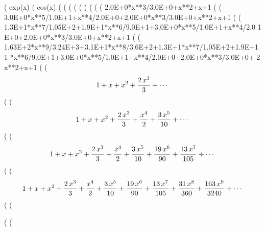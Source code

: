 (%
                                        exp(x)
(%
                                        cos(x)
(%
(%
(%
(%
(%
(%
(%
(%
(%
      2.0E+0*x**3/3.0E+0+x**2+x+1
(%
(%
      3.0E+0*x**5/1.0E+1+x**4/2.0E+0+2.0E+0*x**3/3.0E+0+x**2+x+1
(%
(%
      1.3E+1*x**7/1.05E+2+1.9E+1*x**6/9.0E+1+3.0E+0*x**5/1.0E+1+x**4/2.0
     1   E+0+2.0E+0*x**3/3.0E+0+x**2+x+1
(%
(%
      1.63E+2*x**9/3.24E+3+3.1E+1*x**8/3.6E+2+1.3E+1*x**7/1.05E+2+1.9E+1
     1   *x**6/9.0E+1+3.0E+0*x**5/1.0E+1+x**4/2.0E+0+2.0E+0*x**3/3.0E+0+
     2   x**2+x+1
(%
(%
$$1+x+x^2+{{2\,x^3}\over{3}}+\cdots $$
(%
(%
$$1+x+x^2+{{2\,x^3}\over{3}}+{{x^4}\over{2}}+{{3\,x^5}\over{10}}
 +\cdots $$
(%
(%
$$1+x+x^2+{{2\,x^3}\over{3}}+{{x^4}\over{2}}+{{3\,x^5}\over{10}}+{{19
 \,x^6}\over{90}}+{{13\,x^7}\over{105}}+\cdots $$
(%
(%
$$1+x+x^2+{{2\,x^3}\over{3}}+{{x^4}\over{2}}+{{3\,x^5}\over{10}}+{{19
 \,x^6}\over{90}}+{{13\,x^7}\over{105}}+{{31\,x^8}\over{360}}+{{163\,
 x^9}\over{3240}}+\cdots $$
(%
(%

(%
(%
